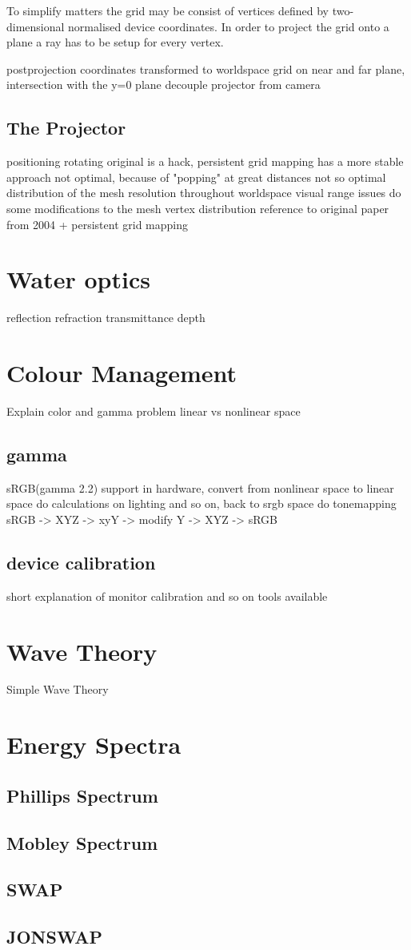 To simplify matters the grid may be consist of vertices defined by
two-dimensional normalised device coordinates. In order to project the grid
onto a plane a ray has to be setup for every vertex.

postprojection coordinates transformed to worldspace
grid on near and far plane, intersection with the y=0 plane
decouple projector from camera

\subsection{The Projector}
positioning
rotating
original is a hack, persistent grid mapping has a more stable approach
not optimal, because of "popping" at great distances
not so optimal distribution of the mesh resolution throughout worldspace
visual range issues
do some modifications to the mesh vertex distribution
reference to original paper from 2004 + persistent grid mapping

\section{Water optics}
reflection
refraction
transmittance
depth

\section{Colour Management}
Explain color and gamma problem
linear vs nonlinear space

\subsection{gamma}
sRGB(gamma 2.2) support in hardware, convert from nonlinear space to linear
space do calculations on lighting and so on, back to srgb space
do tonemapping sRGB -> XYZ -> xyY -> modify Y -> XYZ -> sRGB

\subsection{device calibration}
short explanation of monitor calibration and so on
tools available

\section{Wave Theory}

Simple Wave Theory

\section{Energy Spectra}

\subsection{Phillips Spectrum}
\subsection{Mobley Spectrum}
\subsection{SWAP}
\subsection{JONSWAP}
